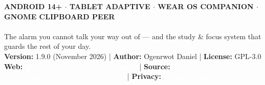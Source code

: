\documentclass[11pt,a4paper]{article}
\begin{document}
\color{wpink}

\thispagestyle{empty}
\begin{heroheader}
  {\sffamily\scriptsize\bfseries\textcolor{wpteal}{ANDROID 14+ $\cdot$ TABLET ADAPTIVE $\cdot$ WEAR OS COMPANION $\cdot$ GNOME CLIPBOARD PEER}}\\[6pt]
  {\sffamily\Huge\bfseries\textcolor{white}{WakeProof}}\\[4pt]
  {\sffamily\large\textcolor{white!92}{The alarm you cannot talk your way out of --- and the study \& focus system that guards the rest of your day.}}\\[10pt]
  {\sffamily\small\textcolor{white!80}{%
    \textbf{Version:} 1.9.0 (November 2026) \quad|\quad
    \textbf{Author:} Ogenrwot Daniel \quad|\quad
    \textbf{License:} GPL-3.0\\[3pt]
    \textbf{Web:} \href{https://ogenrwotdaniel.github.io/wakeproof/}{\textcolor{white}{\underline{ogenrwotdaniel.github.io/wakeproof}}} \quad|\quad
    \textbf{Source:} \href{https://github.com/ogenrwotdaniel/wakeproof}{\textcolor{white}{\underline{github.com/ogenrwotdaniel/wakeproof}}} \quad|\quad
    \textbf{Privacy:} \href{https://ogenrwotdaniel.github.io/wakeproof/privacy/}{\textcolor{white}{\underline{/wakeproof/privacy}}}%
  }}
\end{heroheader}

\vspace{6pt}
\end{document}
